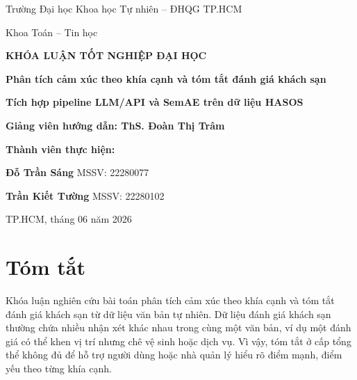 \documentclass[12pt,a4paper]{report}
\newcommand{\universityname}{Trường Đại học Khoa học Tự nhiên -- ĐHQG TP.HCM}
\newcommand{\facultyname}{Khoa Toán -- Tin học}
\newcommand{\advisorname}{ThS. Đoàn Thị Trâm}
\newcommand{\reporttitle}{Phân tích cảm xúc theo khía cạnh và tóm tắt đánh giá khách sạn}
\newcommand{\cityname}{TP.HCM}
\newcommand{\reportyear}{2026}
\begin{document}
\begin{titlepage}
    \centering
    {\Large \universityname \par}
    \vspace{0.2cm}
    {\Large \facultyname \par}

    \vspace{2.0cm}
    {\LARGE \bfseries KHÓA LUẬN TỐT NGHIỆP ĐẠI HỌC\par}

    \vspace{1.0cm}
    {\Huge \bfseries \reporttitle \par}

    \vspace{0.8cm}
    {\Large \bfseries Tích hợp pipeline LLM/API và SemAE trên dữ liệu HASOS\par}

    \vspace{1.5cm}
    {\Large \bfseries Giảng viên hướng dẫn: \advisorname \par}

    \vspace{1.4cm}
    {\Large \bfseries Thành viên thực hiện:\par}
    \vspace{0.4cm}
    {\large
    \textbf{Đỗ Trần Sáng} \hspace{0.5cm} MSSV: 22280077\par
    \vspace{0.2cm}
    \textbf{Trần Kiết Tường} \hspace{0.5cm} MSSV: 22280102\par
    }

    \vfill
    {\large \cityname, tháng 06 năm \reportyear \par}
\end{titlepage}

\chapter*{Tóm tắt}

Khóa luận nghiên cứu bài toán phân tích cảm xúc theo khía cạnh và tóm tắt đánh giá khách sạn từ dữ liệu văn bản tự nhiên. Dữ liệu đánh giá khách sạn thường chứa nhiều nhận xét khác nhau trong cùng một văn bản, ví dụ một đánh giá có thể khen vị trí nhưng chê vệ sinh hoặc dịch vụ. Vì vậy, tóm tắt ở cấp tổng thể không đủ để hỗ trợ người dùng hoặc nhà quản lý hiểu rõ điểm mạnh, điểm yếu theo từng khía cạnh.
\end{document}
